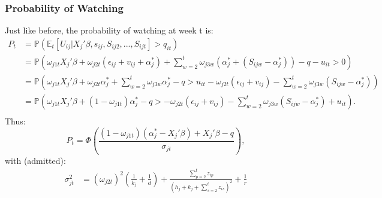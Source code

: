 	\subsubsection{Probability of Watching}
	Just like before, the probability of watching at week t is:
	\begin{align*}
		P_{t}&=\mathbb{P}(\mathbb{E}_t[U_{i j}|X_{j}'\beta, s_{i j}, S_{i j 2}, ..., S_{i j t}]>q_{i t})\\
		&=\mathbb{P}\left(\omega_{j 1 t}X_{j}'\beta +\omega_{j 2 t}(\epsilon_{i j}+v_{i j}+\alpha_{j}^{*})+\sum_{w=2}^{t}\omega_{j 3 w}(\alpha_{j}^{*}+(S_{i j w}-\alpha_{j}^{*}))-q-u_{i t}>0\right)\\
		&=\mathbb{P}\left(\omega_{j 1 t}X_{j}'\beta +\omega_{j 2 t}\alpha_{j}^{*}+\sum_{w=2}^{t}\omega_{j 3 w}\alpha_{j}^{*}-q
		>u_{i t}-\omega_{j 2 t}(\epsilon_{i j}+v_{i j})-\sum_{w=2}^{t}\omega_{j 3 w}(S_{i j w}-\alpha_{j}^{*})\right)\\
		&=\mathbb{P}\left(\omega_{j 1 t}X_{j}'\beta +(1-\omega_{j 1 t})\alpha_{j}^{*}-q
		>-\omega_{j 2 t}(\epsilon_{i j}+v_{i j})-\sum_{w=2}^{t}\omega_{j 3 w}(S_{i j w}-\alpha_{j}^{*})+u_{i t}\right).\\
	\end{align*}
	Thus:
	\begin{equation}
		P_{t}=\Phi\left(\frac{(1-\omega_{j 1 t})(\alpha_{j}^{*}-X_{j}'\beta)+X_{j}'\beta-q}{\sigma_{j t}}\right),
	\end{equation}
	with (admitted):
	\begin{align*}
		\sigma_{j t}^{2}
		&=(\omega_{j 2 t })^{2}\left(\frac{1}{k_{j}}+\frac{1}{d}\right)+\frac{\sum_{p=2}^{t}z_{i p}}{(h_{j}+k_{j}+\sum_{s=2}^{t}z_{i s})^{2}}+\frac{1}{r}
	\end{align*}
	
